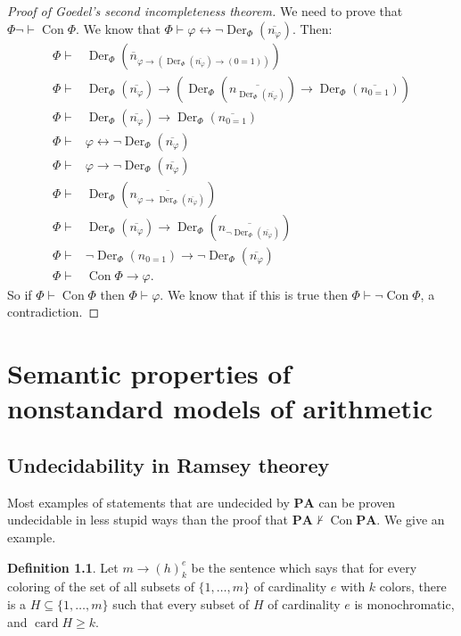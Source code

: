\documentclass[12pt]{report}
\newcommand{\card}{\operatorname{card}}
\DeclareMathOperator{\Der}{Der}
\renewcommand{\iff}{\leftrightarrow}
\newcommand{\PA}{\mathbf{PA}}
\newcommand{\proves}{\vdash}
\DeclareMathOperator{\Con}{Con}
\theoremstyle{definition}
\newtheorem{definition}[theorem]{Definition}
\begin{document}
\begin{proof}[Proof of Goedel's second incompleteness theorem]
We need to prove that $\Phi \neg\proves \Con \Phi$. We know that $\Phi \proves \varphi \iff \neg \Der_\Phi(\overline{n_\varphi})$.
Then:
\begin{align*}
\Phi \proves &\Der_\Phi(\overline n_{\varphi \to (\Der_\Phi(\overline{n_\varphi}) \to (0=1))})\\
\Phi \proves &\Der_\Phi(\overline{n_\varphi}) \to (\Der_\Phi(\overline{n_{\Der_\Phi(\overline{n_\varphi})}}) \to \Der_\Phi(\overline{n_{0=1}}))\\
\Phi \proves &\Der_\Phi(\overline{n_\varphi}) \to \Der_\Phi(\overline{n_{0=1}})\\
\Phi \proves &\varphi \iff \neg \Der_\Phi(\overline{n_\varphi})\\
\Phi \proves &\varphi \to \neg \Der_\Phi(\overline{n_\varphi})\\
\Phi \proves &\Der_\Phi(\overline{n_{\varphi \to \Der_\Phi(\overline{n_\varphi})}})\\
\Phi \proves &\Der_\Phi(\overline{n_\varphi}) \to \Der_\Phi(\overline{n_{\neg \Der_\Phi(\overline{n_\varphi})}})\\
\Phi \proves &\neg\Der_\Phi(n_{0=1}) \to \neg \Der_\Phi(\overline{n_\varphi})\\
\Phi \proves &\Con \Phi \to \varphi.
\end{align*}
So if $\Phi \proves \Con \Phi$ then $\Phi \proves \varphi$. We know that if this is true then $\Phi \proves \neg\Con \Phi$, a contradiction.
\end{proof}

\chapter{Semantic properties of nonstandard models of arithmetic}
\section{Undecidability in Ramsey theorey}
Most examples of statements that are undecided by $\PA$ can be proven undecidable in less stupid ways than the proof that $\PA \not\proves \Con \PA$. We give an example.
\begin{definition}
Let $m \to (h)_k^e$ be the sentence which says that for every coloring of the set of all subsets of $\{1, \dots, m\}$ of cardinality $e$ with $k$ colors, there is a $H \subseteq \{1, \dots, m\}$ such that every subset of $H$ of cardinality $e$ is monochromatic, and $\card H \geq k$.
\end{definition}
\end{document}

